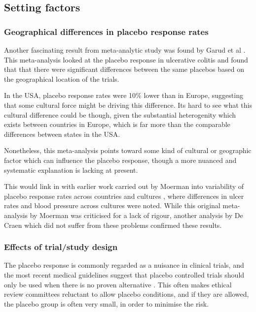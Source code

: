\subsection{Setting factors}
\label{sec:setting-factors}



\subsubsection{Geographical differences in placebo response rates}
\label{sec:geogr-diff-plac}



Another fascinating result from meta-analytic study was found by Garud et al \cite{Garud2008}. This meta-analysis looked at the placebo response in ulcerative colitis and  found that  that there were significant differences between the same placebos based on the geographical location of the trials. 

In the USA, placebo response rates were 10\% lower than in Europe, suggesting that some cultural force might be driving this difference. Its hard to see what this cultural difference could be though, given the substantial heterogenity which exists between countries in Europe, which is far more than the comparable differences between states in the USA. 

Nonetheless, this meta-analysis points toward some kind of cultural or geographic factor which can influence the placebo response, though a more nuanced and systematic explanation is lacking at present. 

This would link in with earlier work carried out by Moerman into variability of placebo response rates across countries and cultures \cite{Moerman2000}, where differences in ulcer rates and blood pressure across cultures were noted. While this original meta-analysis by Moerman was criticised for a lack of rigour, another analysis by  De Craen which did not suffer from these problems \cite{Craen1999a} confirmed these results. 

\subsubsection{Effects of trial/study design}
\label{sec:effects-clin-trial}



The placebo response is commonly regarded as a nuisance in clinical trials, and the most recent medical guidelines suggest that placebo controlled trials should only be used when there is no proven alternative \cite{temple2000placebo}. This often makes ethical review committees reluctant to allow placebo conditions, and if they are allowed, the placebo group is often very small, in order to minimise the risk. 

